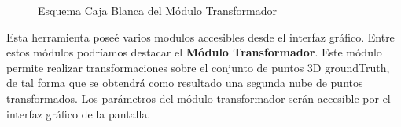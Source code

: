 \begin{figure}[H]
\begin{center}
\hspace{0.5cm}
\end{center}
\caption{Esquema Caja Blanca del Módulo Transformador }
\end{figure}

Esta herramienta poseé varios modulos accesibles desde el interfaz gráfico. Entre estos módulos podríamos destacar el \textbf{Módulo Transformador}.
Este módulo permite realizar transformaciones sobre el conjunto de puntos 3D groundTruth, de tal forma que se obtendrá como resultado una segunda nube de puntos transformados.
Los parámetros del módulo transformador serán accesible por el interfaz gráfico de la pantalla.



